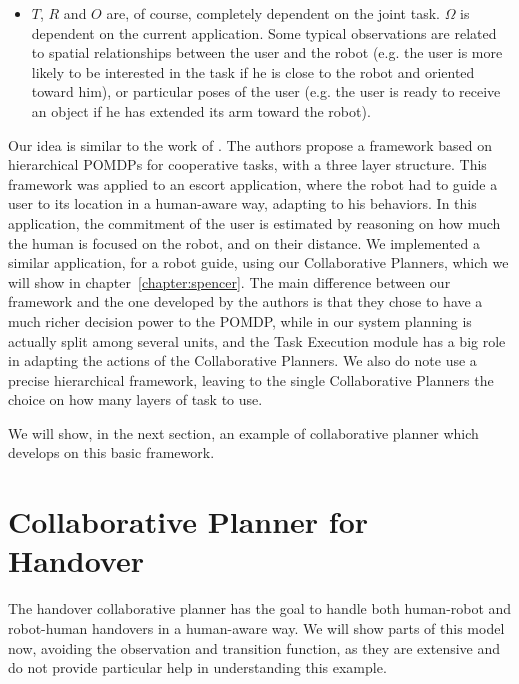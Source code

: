 \begin{itemize}
	\item $T$, $R$ and $O$ are, of course, completely dependent on the joint task.
	$\Omega$ is dependent on the current application. Some typical observations are related to spatial relationships between the user and the robot (e.g. the user is more likely to be interested in the task if he is close to the robot and oriented toward him), or particular poses of the user (e.g. the user is ready to receive an object if he has extended its arm toward the robot).

\end{itemize}

Our idea is similar to the work of \cite{ferrari2015hierarchical}. The authors propose a framework based on hierarchical POMDPs for cooperative tasks, with a three layer structure. This framework was applied to an escort application, where the robot had to guide a user to its location in a human-aware way, adapting to his behaviors. In this application, the commitment of the user is estimated by reasoning on how much the human is focused on the robot, and on their distance.
We implemented a similar application, for a robot guide, using our Collaborative Planners, which we will show in chapter~\ref{chapter:spencer}. The main difference between our framework and the one developed by the authors is that they chose to have a much richer decision power to the POMDP, while in our system planning is actually split among several units, and the Task Execution module has a big role in adapting the actions of the Collaborative Planners. We also do note use a precise hierarchical framework, leaving to the single Collaborative Planners the choice on how many layers of task to use.

We will show, in the next section, an example of collaborative planner which develops on this basic framework.

\section{Collaborative Planner for Handover}
\label{sec:task_execution-handover}
The handover collaborative planner has the goal to handle both human-robot and robot-human handovers in a human-aware way. We will show parts of this model now, avoiding the observation and transition function, as they are extensive and do not provide particular help in understanding this example.

